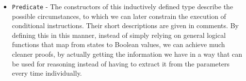 \begin{itemize}
\begin{itemize}
\begin{code}
            \AgdaSpace{}%
            \AgdaSpace{}%
            \<%
            \\
            \\[\AgdaEmptyExtraSkip]%
            \>[2]\AgdaSpace{}%
            \AgdaSpace{}%
            \<%
            \\
            \>[2]\AgdaSpace{}%
            \AgdaSymbol{:}\AgdaSpace{}%
            \AgdaSymbol{\{}\AgdaSpace{}%
            \AgdaSymbol{:}\AgdaSpace{}%
            \AgdaSymbol{\}}\AgdaSpace{}%
            \<%
            \\
            \>[2][@{}l@{\AgdaIndent{0}}]%
            \>[4]\AgdaSpace{}%
            \AgdaSymbol{(}\AgdaSpace{}%
            \AgdaSymbol{)}\AgdaSpace{}%
            \AgdaSpace{}%
            \AgdaSpace{}%
            \AgdaSpace{}%
            \AgdaSpace{}%
            \AgdaSpace{}%
            \AgdaSpace{}%
            \<%
            \\
            \>[4]\AgdaSpace{}%
            \AgdaSymbol{(}\AgdaSpace{}%
            \AgdaSymbol{)}\<%
            \\
            \>[2]\AgdaSpace{}%
            \AgdaOperator{\AgdaFunction{s[}}\AgdaSpace{}%
            \AgdaSpace{}%
            \AgdaOperator{\AgdaFunction{]=}}\AgdaSpace{}%
            \AgdaSpace{}%
            \AgdaSymbol{=}\AgdaSpace{}%
            \AgdaSpace{}%
            \AgdaSpace{}%
            \AgdaSpace{}%
            \<%
        \end{code}
        
    \end{itemize}
    
    \item \verb|Predicate| - The constructors of this inductively defined type describe the possible circumstances, to which we can later constrain the execution of conditional instructions. Their short descriptions are given in comments. By defining this in this manner, instead of simply relying on general logical functions that map from states to Boolean values, we can achieve much cleaner proofs, by actually getting the information we have in a way that can be used for reasoning instead of having to extract it from the parameters every time individually. 
    

\end{itemize}
